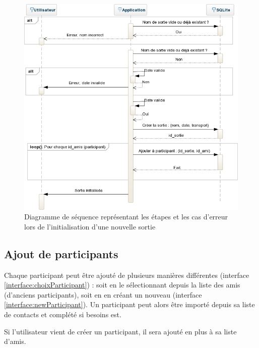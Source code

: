 \documentclass[a4paper, 12pt, notitlepage]{article} %
\begin{document}
\begin{figure}[!htb]
    \centering
    \includegraphics[width=1\textwidth]{Sequence_Initialisation_Sortie.png}
    \caption[Diagramme de séquence d'initialisation de sortie]{Diagramme de séquence représentant les étapes et les cas d'erreur lors de l'initialisation d'une nouvelle sortie}
    \label{fig:InitSortie}
\end{figure}
\clearpage

\subsection{Ajout de participants}
Chaque participant peut être ajouté de plusieurs manières différentes (interface \ref{interface:choixParticipant}) : soit en le sélectionnant depuis la liste des amis (d'anciens participants), soit en en créant un nouveau (interface \ref{interface:newParticipant}). Un participant peut alors être importé depuis sa liste de contacts et complété si besoins est.

Si l'utilisateur vient de créer un participant, il sera ajouté en plus à sa liste d'amis.
\end{document}
